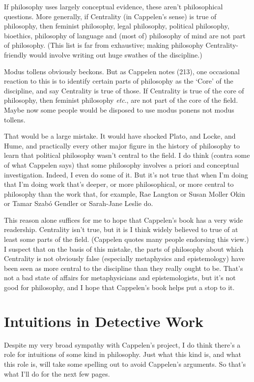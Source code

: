 \noindent If philosophy uses largely conceptual evidence, these aren't philosophical questions. More generally, if Centrality (in Cappelen's sense) is true of philosophy, then feminist philosophy, legal philosophy, political philosophy, bioethics, philosophy of language and (most of) philosophy of mind are not part of philosophy. (This list is far from exhaustive;  making philosophy Centrality-friendly would involve writing out huge swathes of the discipline.)

Modus tollens obviously beckons. But as Cappelen notes (213), one occasional reaction to this is to identify certain parts of philosophy as the `Core' of the discipline, and say Centrality is true of those. If Centrality is true of the core of philosophy, then feminist philosophy \textit{etc}., are not part of the core of the field. Maybe now some people would be disposed to use modus ponens not modus tollens.

That would be a large mistake. It would have shocked Plato, and Locke, and Hume, and practically every other major figure in the history of philosophy to learn that political philosophy wasn't central to the field. I do think (contra some of what Cappelen says) that some philosophy involves a priori and conceptual investigation. Indeed, I even do some of it. But it's not true that when I'm doing that I'm doing work that's deeper, or more philosophical, or more central to philosophy than the work that, for example, Rae Langton or Susan Moller Okin or Tamar Szab\'{o} Gendler or Sarah-Jane Leslie do.

This reason alone suffices for me to hope that Cappelen's book has a very wide readership. Centrality isn't true, but it is I think widely believed to true of at least some parts of the field. (Cappelen quotes many people endorsing this view.) I suspect that on the basis of this mistake, the parts of philosophy about which Centrality is not obviously false (especially metaphysics and epistemology) have been seen as more central to the discipline than they really ought to be. That's not a bad state of affairs for metaphysicians and epistemologists, but it's not good for philosophy, and I hope that Cappelen's book helps put a stop to it.

\section{Intuitions in Detective Work}
\label{sec:Detective}
Despite my very broad sympathy with Cappelen's project, I do think there's a role for intuitions of some kind in philosophy. Just what this kind is, and what this role is, will take some spelling out to avoid Cappelen's arguments. So that's what I'll do for the next few pages.

